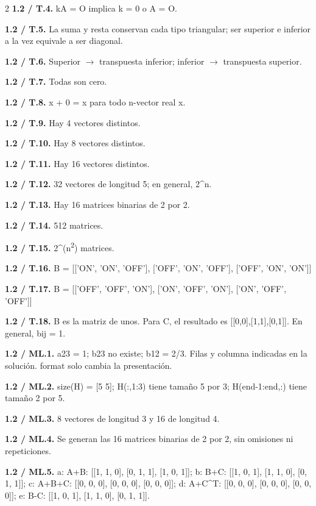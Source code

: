 \documentclass[11pt,a4paper,landscape]{article}
\begin{document}
\begin{multicols}{2}
\textbf{1.2 / T.4.} kA = O implica k = 0 o A = O.\par\smallskip
\textbf{1.2 / T.5.} La suma y resta conservan cada tipo triangular; ser superior e inferior a la vez equivale a ser diagonal.\par\smallskip
\textbf{1.2 / T.6.} Superior $\to$ transpuesta inferior; inferior $\to$ transpuesta superior.\par\smallskip
\textbf{1.2 / T.7.} Todas son cero.\par\smallskip
\textbf{1.2 / T.8.} x + 0 = x para todo n-vector real x.\par\smallskip
\textbf{1.2 / T.9.} Hay 4 vectores distintos.\par\smallskip
\textbf{1.2 / T.10.} Hay 8 vectores distintos.\par\smallskip
\textbf{1.2 / T.11.} Hay 16 vectores distintos.\par\smallskip
\textbf{1.2 / T.12.} 32 vectores de longitud 5; en general, 2\textasciicircum{}n.\par\smallskip
\textbf{1.2 / T.13.} Hay 16 matrices binarias de 2 por 2.\par\smallskip
\textbf{1.2 / T.14.} 512 matrices.\par\smallskip
\textbf{1.2 / T.15.} 2\textasciicircum{}(n\textsuperscript{2}) matrices.\par\smallskip
\textbf{1.2 / T.16.} B = [['ON', 'ON', 'OFF'], ['OFF', 'ON', 'OFF'], ['OFF', 'ON', 'ON']]\par\smallskip
\textbf{1.2 / T.17.} B = [['OFF', 'OFF', 'ON'], ['ON', 'OFF', 'ON'], ['ON', 'OFF', 'OFF']]\par\smallskip
\textbf{1.2 / T.18.} B es la matriz de unos. Para C, el resultado es [[0,0],[1,1],[0,1]]. En general, bij = 1.\par\smallskip
\textbf{1.2 / ML.1.} a23 = 1; b23 no existe; b12 = 2/3. Filas y columna indicadas en la solución. format solo cambia la presentación.\par\smallskip
\textbf{1.2 / ML.2.} size(H) = [5 5]; H(:,1:3) tiene tamaño 5 por 3; H(end-1:end,:) tiene tamaño 2 por 5.\par\smallskip
\textbf{1.2 / ML.3.} 8 vectores de longitud 3 y 16 de longitud 4.\par\smallskip
\textbf{1.2 / ML.4.} Se generan las 16 matrices binarias de 2 por 2, sin omisiones ni repeticiones.\par\smallskip
\textbf{1.2 / ML.5.} a: A+B: [[1, 1, 0], [0, 1, 1], [1, 0, 1]]; b: B+C: [[1, 0, 1], [1, 1, 0], [0, 1, 1]]; c: A+B+C: [[0, 0, 0], [0, 0, 0], [0, 0, 0]]; d: A+C\textasciicircum{}T: [[0, 0, 0], [0, 0, 0], [0, 0, 0]]; e: B-C: [[1, 0, 1], [1, 1, 0], [0, 1, 1]].\par\smallskip
\end{multicols}
\end{document}
